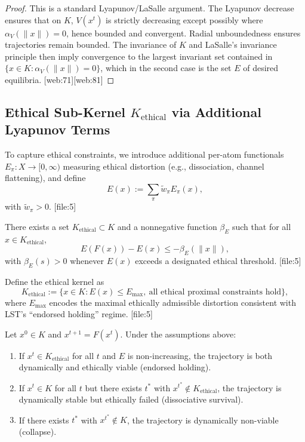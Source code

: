 \documentclass[11pt]{article}
\begin{document}
\begin{proof}
This is a standard Lyapunov/LaSalle argument. The Lyapunov decrease ensures that on \(K\), \(V(x^t)\) is strictly decreasing except possibly where \(\alpha_V(\|x\|)=0\), hence bounded and convergent. Radial unboundedness ensures trajectories remain bounded. The invariance of \(K\) and LaSalle's invariance principle then imply convergence to the largest invariant set contained in \(\{x\in K: \alpha_V(\|x\|)=0\}\), which in the second case is the set \(E\) of desired equilibria. [web:71][web:81]
\end{proof}

\subsection{Ethical Sub-Kernel \(K_{\text{ethical}}\) via Additional Lyapunov Terms}

To capture ethical constraints, we introduce additional per-atom functionals \(E_\pi:X\to[0,\infty)\) measuring ethical distortion (e.g., dissociation, channel flattening), and define
\[
  E(x) := \sum_{\pi} \tilde{w}_\pi E_\pi(x),
\]
with \(\tilde{w}_\pi>0\). [file:5]

\begin{assumption}
There exists a set \(K_{\text{ethical}}\subset K\) and a nonnegative function \(\beta_E\) such that for all \(x\in K_{\text{ethical}}\),
\[
  E(F(x)) - E(x) \leq -\beta_E(\|x\|),
\]
with \(\beta_E(s) > 0\) whenever \(E(x)\) exceeds a designated ethical threshold. [file:5]
\end{assumption}

\begin{definition}
Define the ethical kernel as
\[
  K_{\text{ethical}} := \{ x\in K : E(x) \leq E_{\max},\ \text{all ethical proximal constraints hold} \},
\]
where \(E_{\max}\) encodes the maximal ethically admissible distortion consistent with LST's ``endorsed holding'' regime. [file:5]
\end{definition}

\begin{theorem}
Let \(x^0\in K\) and \(x^{t+1} = F(x^t)\). Under the assumptions above:
\begin{enumerate}[label=(a), leftmargin=*]
  \item If \(x^t\in K_{\text{ethical}}\) for all \(t\) and \(E\) is non-increasing, the trajectory is both dynamically and ethically viable (endorsed holding).
  \item If \(x^t\in K\) for all \(t\) but there exists \(t^\ast\) with \(x^{t^\ast}\notin K_{\text{ethical}}\), the trajectory is dynamically stable but ethically failed (dissociative survival).
  \item If there exists \(t^\ast\) with \(x^{t^\ast}\notin K\), the trajectory is dynamically non-viable (collapse).
\end{enumerate}
\label{thm:classification}
\end{theorem}
\end{document}
